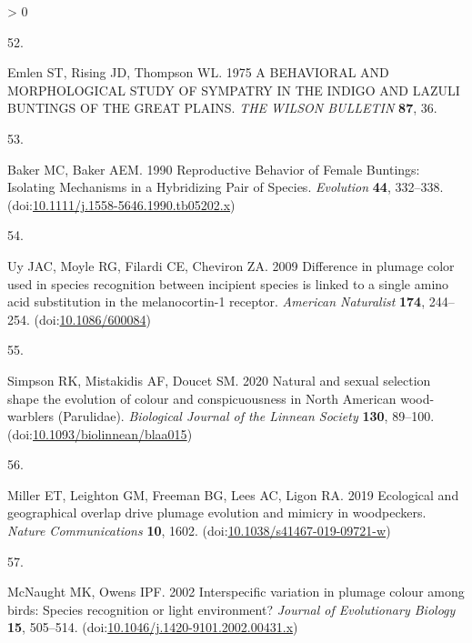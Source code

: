 \documentclass[
  a4paper,
]{article}
\newlength{\cslhangindent}
\newlength{\csllabelwidth}
\newenvironment{CSLReferences}[2] %
 {%
  \setlength{\parindent}{0pt}
  \ifodd #1 \everypar{\setlength{\hangindent}{\cslhangindent}}\ignorespaces\fi
  \ifnum #2 > 0
  \setlength{\parskip}{#2\baselineskip}
  \fi
 }%
 {}
\newcommand{\CSLLeftMargin}[1]{\parbox[t]{\csllabelwidth}{#1}}
\newcommand{\CSLRightInline}[1]{\parbox[t]{\linewidth - \csllabelwidth}{#1}\break}
\begin{document}
\begin{CSLReferences}{0}{0}
\leavevmode\hypertarget{ref-emlen1975}{}%
\CSLLeftMargin{52. }
\CSLRightInline{Emlen ST, Rising JD, Thompson WL. 1975 A {BEHAVIORAL AND
MORPHOLOGICAL STUDY OF SYMPATRY IN THE INDIGO AND LAZULI BUNTINGS OF THE
GREAT PLAINS}. \emph{THE WILSON BULLETIN} \textbf{87}, 36.}

\leavevmode\hypertarget{ref-baker1990}{}%
\CSLLeftMargin{53. }
\CSLRightInline{Baker MC, Baker AEM. 1990 Reproductive {Behavior} of
{Female Buntings}: {Isolating Mechanisms} in a {Hybridizing Pair} of
{Species}. \emph{Evolution} \textbf{44}, 332--338.
(doi:\href{https://doi.org/10.1111/j.1558-5646.1990.tb05202.x}{10.1111/j.1558-5646.1990.tb05202.x})}

\leavevmode\hypertarget{ref-uy2009}{}%
\CSLLeftMargin{54. }
\CSLRightInline{Uy JAC, Moyle RG, Filardi CE, Cheviron ZA. 2009
Difference in plumage color used in species recognition between
incipient species is linked to a single amino acid substitution in the
melanocortin-1 receptor. \emph{American Naturalist} \textbf{174},
244--254. (doi:\href{https://doi.org/10.1086/600084}{10.1086/600084})}

\leavevmode\hypertarget{ref-simpson2020}{}%
\CSLLeftMargin{55. }
\CSLRightInline{Simpson RK, Mistakidis AF, Doucet SM. 2020 Natural and
sexual selection shape the evolution of colour and conspicuousness in
{North American} wood-warblers ({Parulidae}). \emph{Biological Journal
of the Linnean Society} \textbf{130}, 89--100.
(doi:\href{https://doi.org/10.1093/biolinnean/blaa015}{10.1093/biolinnean/blaa015})}

\leavevmode\hypertarget{ref-miller2019}{}%
\CSLLeftMargin{56. }
\CSLRightInline{Miller ET, Leighton GM, Freeman BG, Lees AC, Ligon RA.
2019 Ecological and geographical overlap drive plumage evolution and
mimicry in woodpeckers. \emph{Nature Communications} \textbf{10}, 1602.
(doi:\href{https://doi.org/10.1038/s41467-019-09721-w}{10.1038/s41467-019-09721-w})}

\leavevmode\hypertarget{ref-mcnaught2002}{}%
\CSLLeftMargin{57. }
\CSLRightInline{McNaught MK, Owens IPF. 2002 Interspecific variation in
plumage colour among birds: {Species} recognition or light environment?
\emph{Journal of Evolutionary Biology} \textbf{15}, 505--514.
(doi:\href{https://doi.org/10.1046/j.1420-9101.2002.00431.x}{10.1046/j.1420-9101.2002.00431.x})}

\end{CSLReferences}
\end{document}
